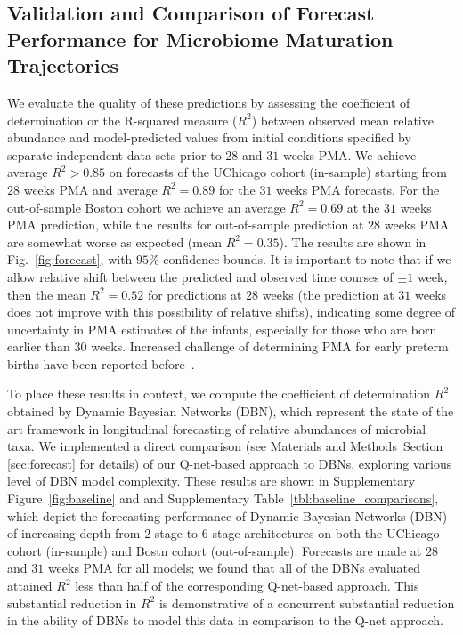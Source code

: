 \documentclass[onecolumn,10pt]{IEEEtran}
\def\qnet{Q-net\xspace}
\def\EXTENDEDDATA{Supplementary\xspace}
\def\Methods{Materials and Methods}
\begin{document}
\subsection*{Validation and Comparison of Forecast Performance for Microbiome Maturation Trajectories}
  We evaluate the quality of these predictions  by assessing the coefficient of determination or the R-squared measure ($R^2$) between observed mean relative abundance and model-predicted values from initial conditions specified by separate independent data sets prior to $28$ and $31$ weeks PMA.  We achieve average $R^2 > 0.85$ on forecasts of the UChicago cohort (in-sample) starting from $28$ weeks PMA and average $R^2 = 0.89$ for the $31$ weeks PMA forecasts. For the out-of-sample Boston cohort we achieve an average  $R^2 = 0.69$ at the $31$ weeks PMA prediction, while the results for out-of-sample prediction at $28$ weeks PMA are somewhat worse as expected (mean $R^2 = 0.35$). The results are shown in Fig.~\ref{fig:forecast}, with $95\%$ confidence bounds. It is important to note that if we allow relative shift between the predicted and observed time courses of $\pm 1$ week, then the mean $R^2 = 0.52$ for predictions at $28$ weeks (the prediction at $31$ weeks does not improve with this possibility of relative shifts), indicating some degree of uncertainty in PMA estimates of the infants, especially for those who are born earlier than 30 weeks. Increased challenge of determining PMA for early preterm births have been reported before~\cite{dietz2007comparison}.
 
To place these results in context, we compute  the coefficient of determination $R^2$ obtained by Dynamic Bayesian Networks (DBN), which represent the state of the art framework in longitudinal forecasting of relative abundances of microbial taxa. We implemented a direct comparison (see \Methods~Section \ref{sec:forecast} for details) of our \qnet-based approach to DBNs, exploring various level of DBN model complexity. These results are shown in \EXTENDEDDATA Figure~\ref{fig:baseline} and and \EXTENDEDDATA Table~\ref{tbl:baseline_comparisons}, which depict the forecasting performance of Dynamic Bayesian Networks (DBN) of increasing depth from 2-stage to 6-stage architectures on both the UChicago cohort (in-sample) and Bostn cohort (out-of-sample). Forecasts are made at $28$ and $31$ weeks PMA for all models; we found that all of the DBNs evaluated attained $R^2$ less than half of the corresponding \qnet-based approach. This substantial reduction in $R^2$ is demonstrative of a concurrent substantial reduction in the ability of DBNs to model this data in comparison to the \qnet approach.  
\end{document}
